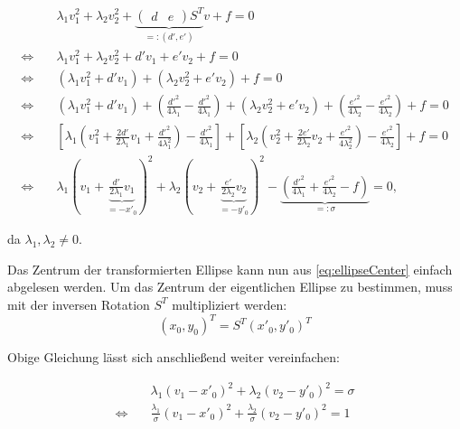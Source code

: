 \begin{equation}\label{eq:ellipseCenter}
\begin{aligned}
&\lambda_1v_1^2 + \lambda_2v_2^2 + \underbrace{\begin{pmatrix}d & e\end{pmatrix}S^T}_{=:(d', e')}v + f = 0 \\
\Leftrightarrow\quad &\lambda_1v_1^2 + \lambda_2v_2^2 + d'v_1 + e'v_2 + f = 0 \\
\Leftrightarrow\quad &(\lambda_1v_1^2 + d'v_1)+ (\lambda_2v_2^2 + e'v_2) + f = 0\\
\Leftrightarrow\quad &(\lambda_1v_1^2 + d'v_1) + (\frac{d'^2}{4\lambda_1} - \frac{d'^2}{4\lambda_1}) + (\lambda_2v_2^2 + e'v_2) + (\frac{e'^2}{4\lambda_2} - \frac{e'^2}{4\lambda_2}) + f = 0 \\
\Leftrightarrow\quad &\left[\lambda_1\left(v_1^2 + \frac{2d'}{2\lambda_1}v_1 + \frac{d'^2}{4\lambda_1^2}\right) - \frac{d'^2}{4\lambda_1}\right] +\left[\lambda_2\left(v_2^2 + \frac{2e'}{2\lambda_2}v_2 + \frac{e'^2}{4\lambda_2^2}\right) - \frac{e'^2}{4\lambda_2}\right] + f = 0 \\
\Leftrightarrow\quad &\lambda_1(v_1 + \underbrace{\frac{d'}{2\lambda_1}v_1}_{ = -x'_0})^2 +\lambda_2(v_2 + \underbrace{\frac{e'}{2\lambda_2}v_2}_{ = -y'_0})^2 - \underbrace{(\frac{d'^2}{4\lambda_1} + \frac{e'^2}{4\lambda_2} - f)}_{=:\sigma} = 0,
\end{aligned}
\end{equation}

da $\lambda_1, \lambda_2 \neq 0$. 

Das Zentrum der transformierten Ellipse kann nun aus \ref{eq:ellipseCenter} einfach abgelesen werden. Um das Zentrum der eigentlichen Ellipse zu bestimmen, muss mit der inversen Rotation $S^T$ multipliziert werden:
\begin{equation*}
(x_0, y_0)^T = S^T(x'_0, y'_0)^T
\end{equation*}

Obige Gleichung lässt sich anschließend weiter vereinfachen: 


\begin{equation} \label{eq:PCAKoeff}
\begin{aligned}
&\lambda_1(v_1 -x'_0)^2 +\lambda_2(v_2 -y'_0)^2 = \sigma \\
\Leftrightarrow\quad & \frac{\lambda_1}{\sigma}(v_1 -x'_0)^2 +\frac{\lambda_2}{\sigma}(v_2 -y'_0)^2  =1
\end{aligned}
\end{equation}

